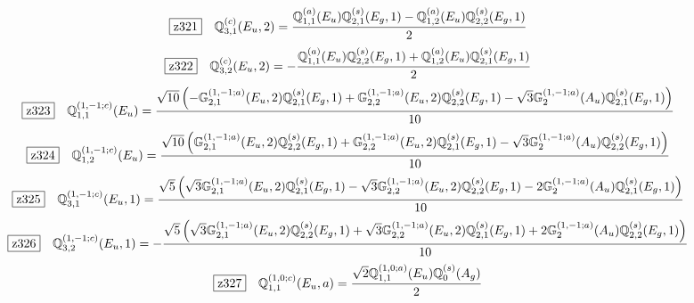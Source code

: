 \documentclass[fleqn,10pt,landscape]{jsarticle}
\begin{document}
\begin{dmath*}
\hspace*{3mm}\fbox{z321}\quad \mathbb{Q}_{3,1}^{(c)}(E_{u},2)=\frac{\mathbb{Q}_{1,1}^{(a)}(E_{u}) \mathbb{Q}_{2,1}^{(s)}(E_{g},1) - \mathbb{Q}_{1,2}^{(a)}(E_{u}) \mathbb{Q}_{2,2}^{(s)}(E_{g},1)}{2}
\end{dmath*}
\begin{dmath*}
\hspace*{3mm}\fbox{z322}\quad \mathbb{Q}_{3,2}^{(c)}(E_{u},2)=- \frac{\mathbb{Q}_{1,1}^{(a)}(E_{u}) \mathbb{Q}_{2,2}^{(s)}(E_{g},1) + \mathbb{Q}_{1,2}^{(a)}(E_{u}) \mathbb{Q}_{2,1}^{(s)}(E_{g},1)}{2}
\end{dmath*}
\begin{dmath*}
\hspace*{3mm}\fbox{z323}\quad \mathbb{Q}_{1,1}^{(1,-1;c)}(E_{u})=\frac{\sqrt{10} \left(- \mathbb{G}_{2,1}^{(1,-1;a)}(E_{u},2) \mathbb{Q}_{2,1}^{(s)}(E_{g},1) + \mathbb{G}_{2,2}^{(1,-1;a)}(E_{u},2) \mathbb{Q}_{2,2}^{(s)}(E_{g},1) - \sqrt{3} \mathbb{G}_{2}^{(1,-1;a)}(A_{u}) \mathbb{Q}_{2,1}^{(s)}(E_{g},1)\right)}{10}
\end{dmath*}
\begin{dmath*}
\hspace*{3mm}\fbox{z324}\quad \mathbb{Q}_{1,2}^{(1,-1;c)}(E_{u})=\frac{\sqrt{10} \left(\mathbb{G}_{2,1}^{(1,-1;a)}(E_{u},2) \mathbb{Q}_{2,2}^{(s)}(E_{g},1) + \mathbb{G}_{2,2}^{(1,-1;a)}(E_{u},2) \mathbb{Q}_{2,1}^{(s)}(E_{g},1) - \sqrt{3} \mathbb{G}_{2}^{(1,-1;a)}(A_{u}) \mathbb{Q}_{2,2}^{(s)}(E_{g},1)\right)}{10}
\end{dmath*}
\begin{dmath*}
\hspace*{3mm}\fbox{z325}\quad \mathbb{Q}_{3,1}^{(1,-1;c)}(E_{u},1)=\frac{\sqrt{5} \left(\sqrt{3} \mathbb{G}_{2,1}^{(1,-1;a)}(E_{u},2) \mathbb{Q}_{2,1}^{(s)}(E_{g},1) - \sqrt{3} \mathbb{G}_{2,2}^{(1,-1;a)}(E_{u},2) \mathbb{Q}_{2,2}^{(s)}(E_{g},1) - 2 \mathbb{G}_{2}^{(1,-1;a)}(A_{u}) \mathbb{Q}_{2,1}^{(s)}(E_{g},1)\right)}{10}
\end{dmath*}
\begin{dmath*}
\hspace*{3mm}\fbox{z326}\quad \mathbb{Q}_{3,2}^{(1,-1;c)}(E_{u},1)=- \frac{\sqrt{5} \left(\sqrt{3} \mathbb{G}_{2,1}^{(1,-1;a)}(E_{u},2) \mathbb{Q}_{2,2}^{(s)}(E_{g},1) + \sqrt{3} \mathbb{G}_{2,2}^{(1,-1;a)}(E_{u},2) \mathbb{Q}_{2,1}^{(s)}(E_{g},1) + 2 \mathbb{G}_{2}^{(1,-1;a)}(A_{u}) \mathbb{Q}_{2,2}^{(s)}(E_{g},1)\right)}{10}
\end{dmath*}
\begin{dmath*}
\hspace*{3mm}\fbox{z327}\quad \mathbb{Q}_{1,1}^{(1,0;c)}(E_{u},a)=\frac{\sqrt{2} \mathbb{Q}_{1,1}^{(1,0;a)}(E_{u}) \mathbb{Q}_{0}^{(s)}(A_{g})}{2}
\end{dmath*}
\end{document}
